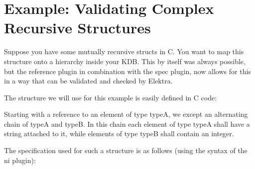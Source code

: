 \hypertarget{autotoc_md594_src_plugins_reference_examples_complex_README_md}{}\section{Example\+: Validating Complex Recursive Structures}\label{autotoc_md594_src_plugins_reference_examples_complex_README_md}
Suppose you have some mutually recursive {\ttfamily struct}s in C. You want to map this structure onto a hierarchy inside your K\+DB. This by itself was always possible, but the reference plugin in combination with the spec plugin, now allows for this in a way that can be validated and checked by Elektra.

The structure we will use for this example is easily defined in C code\+:


\begin{DoxyCode}{0}
\DoxyCodeLine{\};}
\DoxyCodeLine{}
\DoxyCodeLine{\};}
\DoxyCodeLine{}
\end{DoxyCode}


Starting with a reference to an element of type {\ttfamily typeA}, we except an alternating chain of {\ttfamily typeA} and {\ttfamily typeB}. In this chain each element of type {\ttfamily typeA} shall have a string attached to it, while elements of type {\ttfamily typeB} shall contain an integer.

The specification used for such a structure is as follows (using the syntax of the {\ttfamily ni} plugin)\+:


\begin{DoxyCode}{0}
\DoxyCodeLine{}
\DoxyCodeLine{[typeA/\_]}
\DoxyCodeLine{}
\DoxyCodeLine{}
\DoxyCodeLine{}
\DoxyCodeLine{[typeB/\_]}
\DoxyCodeLine{}
\DoxyCodeLine{[typeB/\_/id]}
\DoxyCodeLine{}
\end{DoxyCode}


